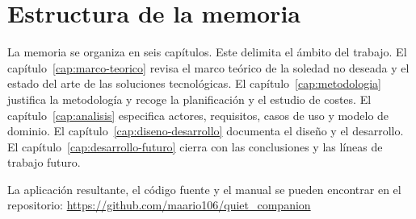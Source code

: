 \section{Estructura de la memoria}

La memoria se organiza en seis capítulos. Este delimita el ámbito del trabajo. El
capítulo~\ref{cap:marco-teorico} revisa el marco teórico de la soledad no deseada y el estado del arte de las
soluciones tecnológicas. El capítulo~\ref{cap:metodologia} justifica la metodología y recoge la planificación
y el estudio de costes. El capítulo~\ref{cap:analisis} especifica actores, requisitos, casos de uso y modelo
de dominio. El capítulo~\ref{cap:diseno-desarrollo} documenta el diseño y el desarrollo. El
capítulo~\ref{cap:desarrollo-futuro} cierra con las conclusiones y las líneas de trabajo futuro.

La aplicación resultante, el código fuente y el manual se pueden encontrar en el repositorio:
\url{https://github.com/maario106/quiet_companion}
